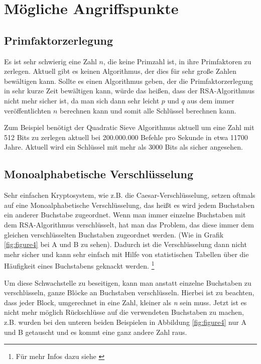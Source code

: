\documentclass[12pt,a4paper]{scrartcl}
\begin{document}
\section{Mögliche Angriffspunkte}
	\subsection{Primfaktorzerlegung}
	Es ist sehr schwierig eine Zahl $n$, die keine Primzahl ist, in ihre Primfaktoren zu zerlegen. Aktuell gibt es keinen Algorithmus, der dies für sehr große Zahlen bewältigen kann. Sollte es einen Algorithmus geben, der die Primfaktorzerlegung in sehr kurze Zeit bewältigen kann, würde das heißen, dass der RSA-Algorithmus nicht mehr sicher ist, da man sich dann sehr leicht $p$ und $q$ aus dem immer veröffentlichten $n$ berechnen kann und somit alle Schlüssel berechnen kann.
	
	Zum Beispiel benötigt der Quadratic Sieve Algorithmus aktuell um eine Zahl mit 512 Bits zu zerlegen aktuell bei 200.000.000 Befehle pro Sekunde in etwa 11700 Jahre. \cite[S. 115]{Beutelspacher2015-jl}
	Aktuell wird ein Schlüssel mit mehr als 3000 Bits als sicher angesehen. \cite[29]{bsireco}
	 
	\subsection{Monoalphabetische Verschlüsselung}
	Sehr einfachen Kryptosystem, wie z.B. die Caesar-Verschlüsselung, setzen oftmals auf eine Monoalphabetische Verschlüsselung, das heißt es wird jedem Buchstaben ein anderer Buchstabe zugeordnet. Wenn man immer einzelne Buchstaben mit dem RSA-Algorithmus verschlüsselt, hat man das Problem, das diese immer dem gleichen verschlüsselten Buchstaben zugeordnet werden. (Wie in Grafik \ref{fig:figure4} bei A und B zu sehen). Dadurch ist die Verschlüsselung dann nicht mehr sicher und kann sehr einfach mit Hilfe von statistischen Tabellen über die Häufigkeit eines Buchstabens geknackt werden. \footnote{Für mehr Infos dazu siehe \cite{mono}}
	
	Um diese Schwachstelle zu beseitigen, kann man anstatt einzelne Buchstaben zu verschlüsseln, ganze Blöcke an Buchstaben verschlüsseln. Hierbei ist zu beachten, dass jeder Block, umgerechnet in eine Zahl, kleiner als \textit{n} sein muss. Jetzt ist es nicht mehr möglich Rückschlüsse auf die verwendeten Buchstaben zu machen, z.B. wurden bei den unteren beiden Beispielen in Abbildung \ref{fig:figure4} nur A und B getauscht und es kommt eine ganz andere Zahl raus.
\end{document}
